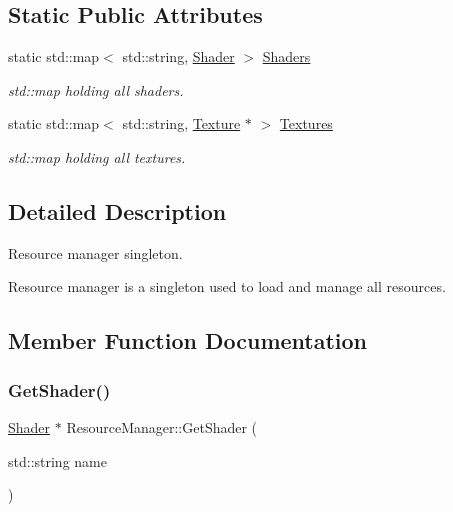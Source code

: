 \subsection*{Static Public Attributes}
\begin{DoxyCompactItemize}
\item 
static std\+::map$<$ std\+::string, \mbox{\hyperlink{class_shader}{Shader}} $>$ \mbox{\hyperlink{class_resource_manager_a8c1bc8fe6e0f92ab3c7e2dca94b0e491}{Shaders}}
\begin{DoxyCompactList}\small\item\em std\+::map holding all shaders. \end{DoxyCompactList}\item 
static std\+::map$<$ std\+::string, \mbox{\hyperlink{class_texture}{Texture}} $\ast$ $>$ \mbox{\hyperlink{class_resource_manager_a43a756e8e9ce85e0cf25946205749a9f}{Textures}}
\begin{DoxyCompactList}\small\item\em std\+::map holding all textures. \end{DoxyCompactList}\end{DoxyCompactItemize}


\subsection{Detailed Description}
Resource manager singleton. 

Resource manager is a singleton used to load and manage all resources. 

\subsection{Member Function Documentation}
\mbox{\label{class_resource_manager_ae95ecdc6de1127616485f7d069437332}} 
\subsubsection{\texorpdfstring{GetShader()}{GetShader()}}
{\footnotesize\ttfamily \mbox{\hyperlink{class_shader}{Shader}} $\ast$ Resource\+Manager\+::\+Get\+Shader (\begin{DoxyParamCaption}\item[{std\+::string}]{name }\end{DoxyParamCaption})\hspace{0.3cm}{\ttfamily [static]}}



